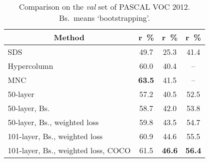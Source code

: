 \documentclass{article}
\begin{document}
\begin{comment}
Note that here we do not report results in \cite{ProposalFree.2015.Liang,CityscapesInstance.2016.Uhrig},
because no comparable experimental results were given.
Uhrig~et~al.~\cite{CityscapesInstance.2016.Uhrig} tested on their own proposed dataset,
while Liang~et~al.~\cite{ProposalFree.2015.Liang} did not follow the commonly-used splits in other works~\cite{SDS.ECCV.2014.Hariharan,HyperColumn.CVPR.2015.Hariharan,MNC.CVPR.2016.Dai}.
Their models were trained with more data, and evaluated on an easier set.
\end{comment}


\begin{comment}
Our best model is similar to the one for semantic segmentation on PASCAL VOC 2012.
The notable differences are as follows.
We do not apply any dropout in this model.
During training, we feed four 500500 image crop per mini-batch.
\end{comment}



\begin{table}[t]
\caption{Comparison on the \emph{val} set of PASCAL VOC 2012. Bs.~means `bootstrapping'.}
\vspace{-2.0mm}
\label{tbl:comparison voc instance}
\footnotesize
\centering
{
\begin{tabular}{l|c|c|c}
\toprule
\multicolumn{1}{c|}{Method} & r~\% & r~\% & r~\% \\
\hline
SDS~\cite{SDS.ECCV.2014.Hariharan} & 49.7 & 25.3 & 41.4 \\
Hypercolumn~\cite{HyperColumn.CVPR.2015.Hariharan} & 60.0 & 40.4 & -- \\
MNC~\cite{MNC.CVPR.2016.Dai} & \textbf{63.5} & 41.5 & -- \\
\hline
\phantom{0}50-layer & 57.2 & 40.5 & 52.5 \\
\phantom{0}50-layer, Bs. & 58.7 & 42.0 & 53.8 \\
\phantom{0}50-layer, Bs., weighted loss & 59.8 & 43.5 & 54.7 \\
101-layer, Bs., weighted loss & 60.9 & 44.6 & 55.5 \\
101-layer, Bs., weighted loss, COCO & 61.5 & \textbf{46.6} & {\bf 56.4} \\
\bottomrule
\end{tabular}
}
\end{table}
\end{document}
